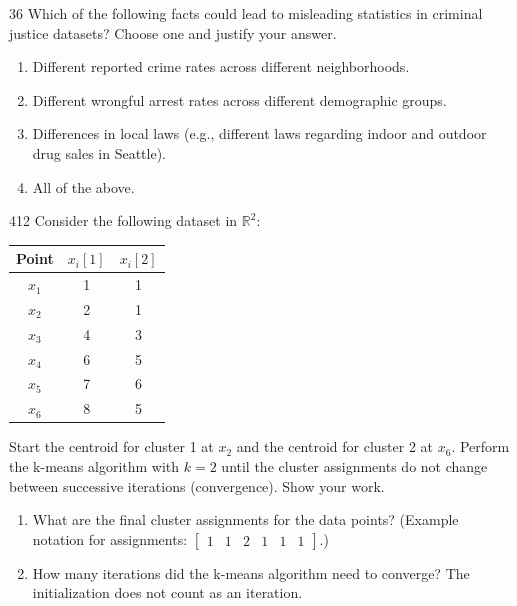 \documentclass[11pt]{article}
\begin{document}
\begin{studentanswer}[10]
\end{studentanswer}

\begin{problem}{3}{6}
Which of the following facts could lead to misleading statistics in criminal justice datasets? Choose one and justify your answer.
\begin{enumerate}[label=(\alph*)]
\item Different reported crime rates across different neighborhoods.
\item Different wrongful arrest rates across different demographic groups.
\item Differences in local laws (e.g., different laws regarding indoor and outdoor drug sales in Seattle).
\item All of the above.
\end{enumerate}
\end{problem}
\begin{studentanswer}[5]
\end{studentanswer}

\newpage



\begin{problem}{4}{12}
Consider the following dataset in $\mathbb{R}^2$:

\begin{center}
\begin{tabular}{c|cc}
\textbf{Point} & $x_i\left[1\right]$ & $x_i\left[2\right]$ \\ \hline
$x_1$ & 1 & 1 \\ 
$x_2$ & 2 & 1 \\ 
$x_3$ & 4 & 3 \\ 
$x_4$ & 6 & 5 \\ 
$x_5$ & 7 & 6 \\ 
$x_6$ & 8 & 5 \\ 
\end{tabular}
\end{center}

Start the centroid for cluster 1 at $x_2$ and the centroid for cluster 2 at $x_6$. Perform the k-means algorithm with $k=2$ until the cluster assignments do not change between successive iterations (convergence). Show your work.
\begin{enumerate}[label=(\alph*)]
\item What are the final cluster assignments for the data points? (Example notation for assignments: $\begin{bmatrix} 1 & 1 & 2 & 1 & 1 & 1 \end{bmatrix}$.)
\item How many iterations did the k-means algorithm need to converge? The initialization does not count as an iteration.
\end{enumerate}
\end{problem}
\end{document}
